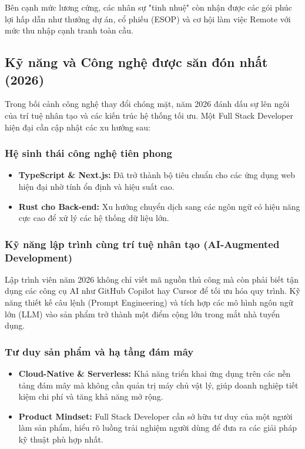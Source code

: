 \documentclass[12pt,a4paper]{article}
\begin{document}
Bên cạnh mức lương cứng, các nhân sự "tinh nhuệ" còn nhận được các gói phúc lợi hấp dẫn như thưởng dự án, cổ phiếu (ESOP) và cơ hội làm việc Remote với mức thu nhập cạnh tranh toàn cầu.

\subsection{Kỹ năng và Công nghệ được săn đón nhất (2026)}

\hspace{0.7cm}Trong bối cảnh công nghệ thay đổi chóng mặt, năm 2026 đánh dấu sự lên ngôi của trí tuệ nhân tạo và các kiến trúc hệ thống tối ưu. Một Full Stack Developer hiện đại cần cập nhật các xu hướng sau:
\subsubsection{Hệ sinh thái công nghệ tiên phong}
\begin{itemize}
    \item \textbf{TypeScript \& Next.js:} Đã trở thành bộ tiêu chuẩn cho các ứng dụng web hiện đại nhờ tính ổn định và hiệu suất cao.
    \item \textbf{Rust cho Back-end:} Xu hướng chuyển dịch sang các ngôn ngữ có hiệu năng cực cao để xử lý các hệ thống dữ liệu lớn.
\end{itemize}
\subsubsection{Kỹ năng lập trình cùng trí tuệ nhân tạo (AI-Augmented Development)}
Lập trình viên năm 2026 không chỉ viết mã nguồn thủ công mà còn phải biết tận dụng các công cụ AI như GitHub Copilot hay Cursor để tối ưu hóa quy trình. Kỹ năng thiết kế câu lệnh (Prompt Engineering) và tích hợp các mô hình ngôn ngữ lớn (LLM) vào sản phẩm trở thành một điểm cộng lớn trong mắt nhà tuyển dụng.

\subsubsection{Tư duy sản phẩm và hạ tầng đám mây}
\begin{itemize}
    \item \textbf{Cloud-Native \& Serverless:} Khả năng triển khai ứng dụng trên các nền tảng đám mây mà không cần quản trị máy chủ vật lý, giúp doanh nghiệp tiết kiệm chi phí và tăng khả năng mở rộng.
    \item \textbf{Product Mindset:} Full Stack Developer cần sở hữu tư duy của một người làm sản phẩm, hiểu rõ luồng trải nghiệm người dùng để đưa ra các giải pháp kỹ thuật phù hợp nhất.
\end{itemize}
\end{document}
